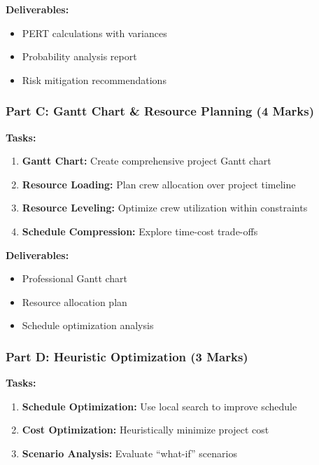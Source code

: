 \documentclass[
  letterpaper,
  DIV=11,
  numbers=noendperiod]{scrreprt}
\providecommand{\tightlist}{%
  \setlength{\itemsep}{0pt}\setlength{\parskip}{0pt}}
\begin{document}
\textbf{Deliverables:}

\begin{itemize}
\tightlist
\item
  PERT calculations with variances
\item
  Probability analysis report
\item
  Risk mitigation recommendations
\end{itemize}

\subsubsection{Part C: Gantt Chart \& Resource Planning (4
Marks)}\label{part-c-gantt-chart-resource-planning-4-marks}

\textbf{Tasks:}

\begin{enumerate}
\def\labelenumi{\arabic{enumi}.}
\tightlist
\item
  \textbf{Gantt Chart:} Create comprehensive project Gantt chart
\item
  \textbf{Resource Loading:} Plan crew allocation over project timeline
\item
  \textbf{Resource Leveling:} Optimize crew utilization within
  constraints
\item
  \textbf{Schedule Compression:} Explore time-cost trade-offs
\end{enumerate}

\textbf{Deliverables:}

\begin{itemize}
\tightlist
\item
  Professional Gantt chart
\item
  Resource allocation plan
\item
  Schedule optimization analysis
\end{itemize}

\subsubsection{Part D: Heuristic Optimization (3
Marks)}\label{part-d-heuristic-optimization-3-marks}

\textbf{Tasks:}

\begin{enumerate}
\def\labelenumi{\arabic{enumi}.}
\tightlist
\item
  \textbf{Schedule Optimization:} Use local search to improve schedule
\item
  \textbf{Cost Optimization:} Heuristically minimize project cost
\item
  \textbf{Scenario Analysis:} Evaluate ``what-if'' scenarios
\end{enumerate}
\end{document}
